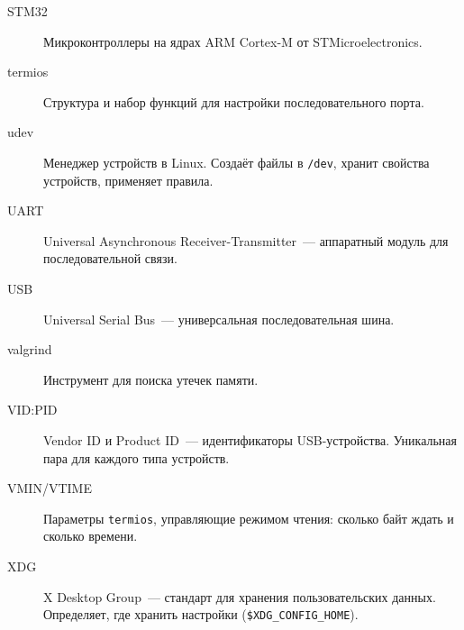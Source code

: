 \begin{description}
\item[STM32] Микроконтроллеры на ядрах ARM Cortex-M от
    STMicroelectronics.

\item[termios] Структура и набор функций для настройки
    последовательного порта.

\item[udev] Менеджер устройств в Linux. Создаёт файлы в
    \texttt{/dev}, хранит свойства устройств, применяет правила.

\item[UART] Universal Asynchronous Receiver-Transmitter~---
    аппаратный модуль для последовательной связи.

\item[USB] Universal Serial Bus~--- универсальная
    последовательная шина.

\item[valgrind] Инструмент для поиска утечек памяти.

\item[VID:PID] Vendor ID и Product ID~--- идентификаторы
    USB-устройства. Уникальная пара для каждого типа устройств.

\item[VMIN/VTIME] Параметры \texttt{termios}, управляющие
    режимом чтения: сколько байт ждать и сколько времени.

\item[XDG] X Desktop Group~--- стандарт для хранения
    пользовательских данных. Определяет, где хранить настройки
    (\texttt{\$XDG\_CONFIG\_HOME}).

\end{description}
